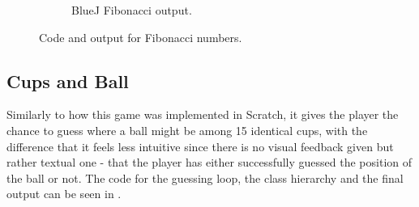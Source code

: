 \begin{figure}[!h]
\begin{subfigure}[b]{0.45\textwidth}
\begin{center}
      \caption{BlueJ Fibonacci output.}
      \label{fig:bluej_fibo_code2}
    \end{center}
    \end{subfigure}
    \caption{Code and output for Fibonacci numbers.}
    \label{fig:bluej_fibo}
\end{figure}
\subsection{Cups and Ball}
Similarly to how this game was implemented in Scratch, it gives the player the chance to guess where a ball might be among 15 identical cups, with the difference that it feels less intuitive since there is no visual feedback given but rather textual one - that the player has either successfully guessed the position of the ball or not. The code for the guessing loop, the class hierarchy and the final output can be seen in .

